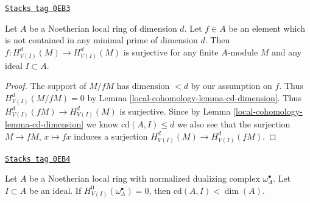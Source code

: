 \begin{lemma}
\label{local-cohomology-lemma-top-coh-divisible}
\href{https://stacks.math.columbia.edu/tag/0EB3}{\texttt{Stacks tag 0EB3}}

Let $A$ be a Noetherian local ring of dimension $d$. Let $f \in A$
be an element which is not contained in any minimal prime of
dimension $d$. Then $f : H^d_{V(I)}(M) \to H^d_{V(I)}(M)$
is surjective for any finite $A$-module $M$ and any ideal $I \subset A$.
\end{lemma}

\begin{proof}
The support of $M/fM$ has dimension $< d$ by our assumption on $f$.
Thus $H^d_{V(I)}(M/fM) = 0$ by Lemma \ref{local-cohomology-lemma-cd-dimension}.
Thus $H^d_{V(I)}(fM) \to H^d_{V(I)}(M)$ is surjective.
Since by Lemma \ref{local-cohomology-lemma-cd-dimension} we know $\text{cd}(A, I) \leq d$
we also see that the surjection $M \to fM$, $x \mapsto fx$
induces a surjection $H^d_{V(I)}(M) \to H^d_{V(I)}(fM)$.
\end{proof}

\begin{lemma}
\label{local-cohomology-lemma-cd-bound-dualizing}
\href{https://stacks.math.columbia.edu/tag/0EB4}{\texttt{Stacks tag 0EB4}}

Let $A$ be a Noetherian local ring with
normalized dualizing complex $\omega_A^\bullet$.
Let $I \subset A$ be an ideal.
If $H^0_{V(I)}(\omega_A^\bullet) = 0$, then $\text{cd}(A, I) < \dim(A)$.
\end{lemma}

